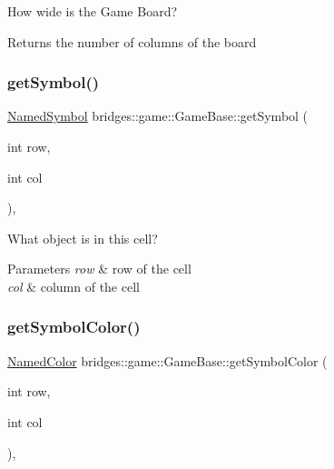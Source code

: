 How wide is the Game Board? 

\begin{DoxyReturn}{Returns}
the number of columns of the board 
\end{DoxyReturn}
\mbox{\label{classbridges_1_1game_1_1_game_base_a0dfec715b0ed49c37b4b6689f2470b25}} 
\subsubsection{\texorpdfstring{get\+Symbol()}{getSymbol()}}
{\footnotesize\ttfamily \hyperlink{namespacebridges_1_1game_ab9a19c7ab6e2ebac2f95180e21733487}{Named\+Symbol} bridges\+::game\+::\+Game\+Base\+::get\+Symbol (\begin{DoxyParamCaption}\item[{int}]{row,  }\item[{int}]{col }\end{DoxyParamCaption})\hspace{0.3cm}{\ttfamily [inline]}, {\ttfamily [protected]}}



What object is in this cell? 


\begin{DoxyParams}{Parameters}
{\em row} & row of the cell \\
\hline
{\em col} & column of the cell \\
\hline
\end{DoxyParams}
\mbox{\label{classbridges_1_1game_1_1_game_base_a26c9f9547cc6f992a829ce5d6edd8f85}} 
\subsubsection{\texorpdfstring{get\+Symbol\+Color()}{getSymbolColor()}}
{\footnotesize\ttfamily \hyperlink{namespacebridges_1_1game_afaa832a4322b25b6a4ebfba832f10f26}{Named\+Color} bridges\+::game\+::\+Game\+Base\+::get\+Symbol\+Color (\begin{DoxyParamCaption}\item[{int}]{row,  }\item[{int}]{col }\end{DoxyParamCaption})\hspace{0.3cm}{\ttfamily [inline]}, {\ttfamily [protected]}}




